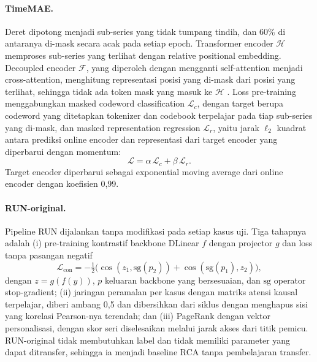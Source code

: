 \paragraph{TimeMAE.} Deret dipotong menjadi sub-series yang tidak tumpang tindih, dan 60\% di antaranya di-mask secara acak pada setiap epoch. Transformer encoder $\mathcal{H}$ memproses sub-series yang terlihat dengan relative positional embedding. Decoupled encoder $\mathcal{F}$, yang diperoleh dengan mengganti self-attention menjadi cross-attention, menghitung representasi posisi yang di-mask dari posisi yang terlihat, sehingga tidak ada token mask yang masuk ke $\mathcal{H}$ \cite{cheng2026timemae}. Loss pre-training menggabungkan masked codeword classification $\mathcal{L}_c$, dengan target berupa codeword yang ditetapkan tokenizer dan codebook terpelajar pada tiap sub-series yang di-mask, dan masked representation regression $\mathcal{L}_r$, yaitu jarak $\ell_2$ kuadrat antara prediksi online encoder dan representasi dari target encoder yang diperbarui dengan momentum:
\begin{equation}
\mathcal{L}=\alpha\,\mathcal{L}_c+\beta\,\mathcal{L}_r .
\end{equation}
Target encoder diperbarui sebagai exponential moving average dari online encoder dengan koefisien 0,99.

\paragraph{RUN-original.} Pipeline RUN \cite{lin2024run} dijalankan tanpa modifikasi pada setiap kasus uji. Tiga tahapnya adalah (i) pre-training kontrastif backbone DLinear $f$ dengan projector $g$ dan loss tanpa pasangan negatif
\begin{equation}
\mathcal{L}_{\mathrm{con}}=-\tfrac{1}{2}\bigl(\cos(z_1,\mathrm{sg}(p_2))+\cos(\mathrm{sg}(p_1),z_2)\bigr),
\end{equation}
dengan $z=g(f(y))$, $p$ keluaran backbone yang bersesuaian, dan $\mathrm{sg}$ operator stop-gradient; (ii) jaringan peramalan per kasus dengan matriks atensi kausal terpelajar, diberi ambang 0,5 dan dibersihkan dari siklus dengan menghapus sisi yang korelasi Pearson-nya terendah; dan (iii) PageRank dengan vektor personalisasi, dengan skor seri diselesaikan melalui jarak akses dari titik pemicu. RUN-original tidak membutuhkan label dan tidak memiliki parameter yang dapat ditransfer, sehingga ia menjadi baseline RCA tanpa pembelajaran transfer.

